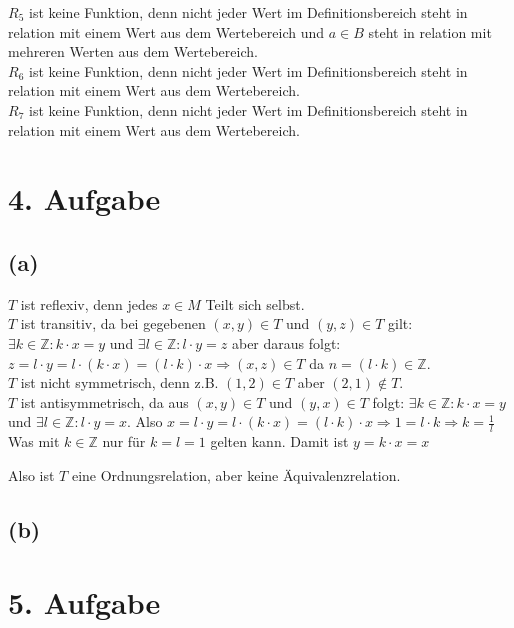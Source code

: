 \documentclass[]{article}
\newcommand{\rarr}{\Rightarrow}
\begin{document}
	$R_5$ ist keine Funktion, denn nicht jeder Wert im Definitionsbereich steht in relation mit einem Wert aus dem Wertebereich und $a \in B$ steht in relation mit mehreren Werten aus dem Wertebereich.\\

	$R_6$ ist keine Funktion, denn nicht jeder Wert im Definitionsbereich steht in relation mit einem Wert aus dem Wertebereich.\\

	$R_7$ ist keine Funktion, denn nicht jeder Wert im Definitionsbereich steht in relation mit einem Wert aus dem Wertebereich.\\

\section*{4. Aufgabe}
\subsection*{(a)}
	$T$ ist reflexiv, denn jedes $x \in M$ Teilt sich selbst.\\

	$T$ ist transitiv, da bei gegebenen $(x,y) \in T$ und $(y,z) \in T$ gilt:
	$\exists k \in \mathbb{Z}: k \cdot x = y$ und $\exists l \in \mathbb{Z}: l \cdot y = z$ aber daraus folgt: $z = l \cdot y = l \cdot (k \cdot x) = (l \cdot k) \cdot x \rarr (x,z) \in T$ da $n = (l \cdot k) \in \mathbb{Z}$.\\

	$T$ ist nicht symmetrisch, denn z.B. $(1,2) \in T$ aber $(2,1) \notin T$.\\

	$T$ ist antisymmetrisch, da aus $(x,y) \in T$ und $(y,x) \in T$ folgt: $\exists k \in \mathbb{Z}: k \cdot x = y$ und $\exists l \in \mathbb{Z}: l \cdot y = x$. Also $x = l \cdot y = l \cdot (k \cdot x) = (l \cdot k) \cdot x \rarr 1 = l \cdot k \rarr k = \frac{1}{l}$ Was mit $k \in \mathbb{Z}$ nur für $k = l = 1$ gelten kann. Damit ist $y = k \cdot x = x$

	Also ist $T$ eine Ordnungsrelation, aber keine Äquivalenzrelation.
\subsection*{(b)}


\section*{5. Aufgabe}
\newpage
\end{document}
